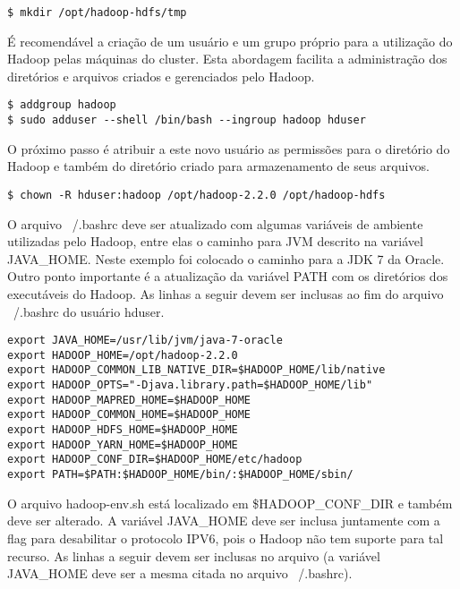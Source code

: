 \begin{apendicesenv}
\begin{lstlisting}[style=abnt,frame=single]
$ mkdir /opt/hadoop-hdfs/tmp
\end{lstlisting}

É recomendável a criação de um usuário e um grupo próprio para a utilização do Hadoop pelas máquinas do cluster. Esta abordagem facilita a administração dos diretórios e arquivos criados e gerenciados pelo Hadoop.

\begin{lstlisting}[float, style=abnt,frame=single]
$ addgroup hadoop
$ sudo adduser --shell /bin/bash --ingroup hadoop hduser
\end{lstlisting}

O próximo passo é atribuir a este novo usuário as permissões para o diretório do Hadoop e também do diretório criado para armazenamento de seus arquivos.

\begin{lstlisting}[style=abnt,frame=single]
$ chown -R hduser:hadoop /opt/hadoop-2.2.0 /opt/hadoop-hdfs
\end{lstlisting}

O arquivo ~/.bashrc deve ser atualizado com algumas variáveis de ambiente utilizadas pelo Hadoop, entre elas o caminho para JVM descrito na variável JAVA\_HOME. Neste exemplo foi colocado o caminho para a JDK 7 da Oracle. Outro ponto importante é a atualização da variável PATH com os diretórios dos executáveis do Hadoop. As linhas a seguir devem ser inclusas ao fim do arquivo ~/.bashrc do usuário hduser.

\begin{lstlisting}[style=abnt,frame=single]
export JAVA_HOME=/usr/lib/jvm/java-7-oracle 
export HADOOP_HOME=/opt/hadoop-2.2.0 
export HADOOP_COMMON_LIB_NATIVE_DIR=$HADOOP_HOME/lib/native 
export HADOOP_OPTS="-Djava.library.path=$HADOOP_HOME/lib" 
export HADOOP_MAPRED_HOME=$HADOOP_HOME 
export HADOOP_COMMON_HOME=$HADOOP_HOME 
export HADOOP_HDFS_HOME=$HADOOP_HOME 
export HADOOP_YARN_HOME=$HADOOP_HOME 
export HADOOP_CONF_DIR=$HADOOP_HOME/etc/hadoop 
export PATH=$PATH:$HADOOP_HOME/bin/:$HADOOP_HOME/sbin/
\end{lstlisting}

O arquivo hadoop-env.sh está localizado em \$HADOOP\_CONF\_DIR e também deve ser alterado. A variável JAVA\_HOME deve ser inclusa juntamente com a flag para desabilitar o protocolo IPV6, pois o Hadoop não tem suporte para tal recurso. As linhas a seguir devem ser inclusas no arquivo (a variável JAVA\_HOME deve ser a mesma citada no arquivo ~/.bashrc).


\end{apendicesenv}
